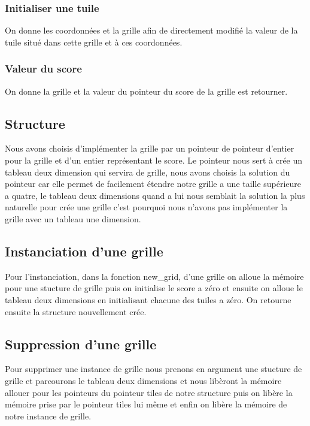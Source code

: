 \documentclass{article}
\begin{document}
\subsubsection{Initialiser une tuile}

On donne les coordonnées et la grille afin de directement modifié la valeur de la tuile situé dans cette grille et à ces coordonnées.

\subsubsection{Valeur du score}

On donne la grille et la valeur du pointeur du score de la grille est retourner.


\subsection{Structure}

Nous avons choisis d'implémenter la grille par un pointeur de pointeur d'entier pour la grille et d'un entier représentant le score. Le pointeur nous sert à crée un tableau deux dimension qui servira de grille, nous avons choisis la solution du pointeur car elle permet de facilement étendre notre grille a une taille supérieure a quatre, le tableau deux dimensions quand a lui nous semblait la solution la plus naturelle pour crée une grille c'est pourquoi nous n'avons pas implémenter la grille avec un tableau une dimension.

\subsection{Instanciation d'une grille}

Pour l'instanciation, dans la fonction new\_grid, d'une grille on alloue la mémoire pour une stucture de grille puis on initialise le score a zéro et ensuite on alloue le tableau deux dimensions en initialisant chacune des tuiles a zéro. On retourne ensuite la structure nouvellement crée.

\subsection{Suppression d'une grille}

Pour supprimer une instance de grille nous prenons en argument une stucture de grille et parcourons le tableau deux dimensions et nous libèront la mémoire allouer pour les pointeurs du pointeur tiles de notre structure puis on libère la mémoire prise par le pointeur tiles lui même et enfin on libère la mémoire de notre instance de grille.
\end{document}
